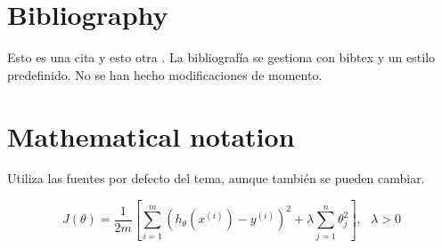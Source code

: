 \section{Bibliography}

Esto es una cita \cite{RUSSELL} y esto otra \cite{AlphaZero}. La bibliografía se gestiona con bibtex y un estilo predefinido. No se han hecho modificaciones de momento.

\section{Mathematical notation}

Utiliza las fuentes por defecto del tema, aunque también se pueden cambiar.

\[
J(\theta)=\frac{1}{2m}\left[ \sum_{i=1}^m\left(h_\theta(x^{(i)})-y^{(i)}\right)^2 + \lambda \sum_{j=1}^n \theta_j^2 \right], \mbox{ } \lambda >0
\]

